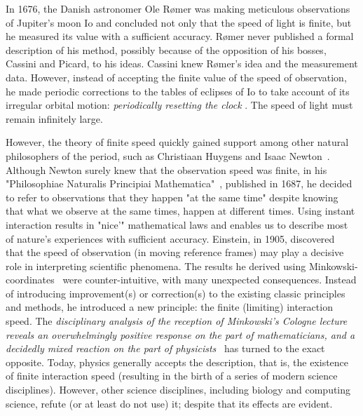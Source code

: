 {


In 1676, the Danish astronomer Ole Rømer was making meticulous observations
of Jupiter's moon Io and concluded not only that the speed of light
is finite, but he measured its value with a sufficient accuracy. Rømer
never published a formal description of his method, possibly because
of the opposition of his bosses, Cassini and Picard, to his ideas.
Cassini knew Rømer's idea and the measurement data. However, instead
of accepting the finite value of the speed of observation, he made
periodic corrections to the tables of eclipses of Io to take account
of its irregular orbital motion: \textit{
\hypertarget{ResettingClock}
{periodically resetting the clock}
}.
The speed of light must remain infinitely large.

However, the theory of finite speed quickly gained support among other
natural philosophers of the period, such as Christiaan Huygens and
Isaac Newton~\cite{Roemer:1676}. Although Newton surely knew that
the observation speed was finite, in his "Philosophiae Naturalis
Principiai Mathematica"~\cite{NewtonPrincipia:1687}, published
in 1687, he decided to refer to observations that they happen "at
the same time" despite knowing that what we observe at the same
times, happen at different times. Using instant interaction results
in "nice'" mathematical laws and enables us to describe most of
nature's experiences with sufficient accuracy.
%
Einstein, in 1905, discovered~\cite{EinsteinSpecial:1905} that the speed of observation (in moving
reference frames) may play a decisive role in interpreting scientific
phenomena. The results he derived using Minkowski-coordinates~\cite{Minkowski:1908} were
counter-intuitive, with many unexpected consequences. Instead of introducing
improvement(s) or correction(s) to the existing classic principles
and methods, he introduced a new principle: the finite (limiting) interaction speed.
The \textit{disciplinary analysis of the reception of
Minkowski's Cologne lecture reveals an overwhelmingly
positive response on the part of mathematicians, and a decidedly mixed
reaction on the part of physicists}~\cite{Minkowski100:2008}
has turned to the exact opposite. Today, physics generally accepts
the description, that is, the existence of finite interaction speed
(resulting in the birth of a series of modern science disciplines).
However, other science disciplines, including biology and computing
science, refute (or at least do not use) it; despite that its effects are evident.
}

